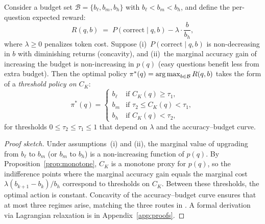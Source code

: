 \begin{proposition}
\label{prop:threshold}
Consider a budget set $\mathcal{B} = \{b_\ell, b_m, b_h\}$ with
$b_\ell < b_m < b_h$, and define the per-question expected reward:
\begin{equation}
  R(q, b) \;=\; P\!\left(\textrm{correct} \mid q, b\right) - \lambda \cdot
  \frac{b}{b_h},
  \label{eq:reward}
\end{equation}
where $\lambda \ge 0$ penalizes token cost.
Suppose (i)~$P(\textrm{correct} \mid q, b)$ is non-decreasing in $b$
with diminishing returns (concavity), and
(ii)~the marginal accuracy gain of increasing the budget is
non-increasing in $p(q)$ (easy questions benefit less from extra budget).
Then the optimal policy $\pi^*(q) = \operatorname*{arg\,max}_{b \in \mathcal{B}} R(q, b)$
takes the form of a \emph{threshold policy on $C_K$}:
\begin{equation}
  \pi^*(q) =
  \begin{cases}
    b_\ell & \text{if } C_K(q) \ge \tau_1, \\
    b_m    & \text{if } \tau_2 \le C_K(q) < \tau_1, \\
    b_h    & \text{if } C_K(q) < \tau_2,
  \end{cases}
  \label{eq:threshold-policy}
\end{equation}
for thresholds $0 \le \tau_2 \le \tau_1 \le 1$ that depend on $\lambda$
and the accuracy--budget curve.
\end{proposition}

\begin{proof}[Proof sketch]
Under assumptions~(i) and (ii), the marginal value of upgrading from
$b_\ell$ to $b_m$ (or $b_m$ to $b_h$) is a non-increasing function of
$p(q)$.
By Proposition~\ref{prop:monotone}, $C_K$ is a monotone proxy for
$p(q)$, so the indifference points where the marginal accuracy gain
equals the marginal cost $\lambda(b_{k+1}-b_k)/b_h$ correspond to
thresholds on $C_K$.
Between these thresholds, the optimal action is constant.
Concavity of the accuracy--budget curve ensures that at most three
regimes arise, matching the three routes in \method{}.
A formal derivation via Lagrangian relaxation is in
Appendix~\ref{app:proofs}.
\end{proof}

